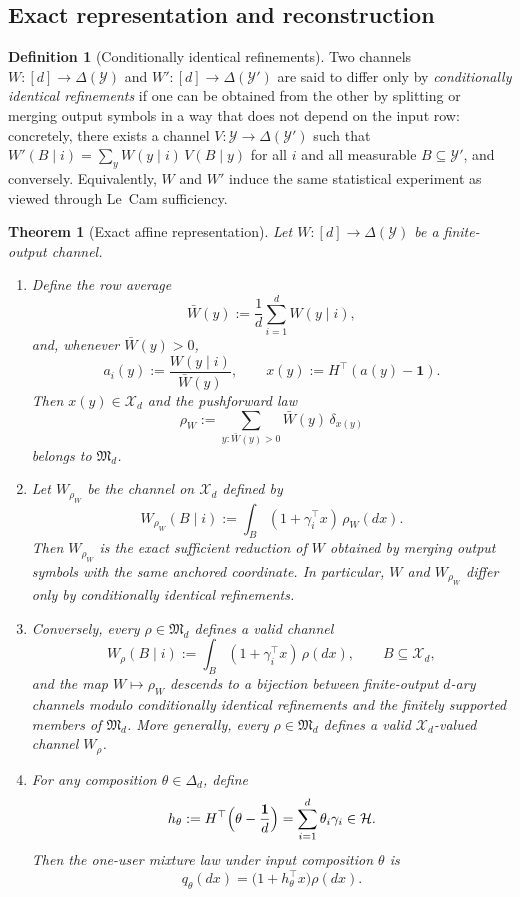 \documentclass[11pt]{amsart}
\newtheorem{theorem}{Theorem}[section]
\theoremstyle{definition}
\newtheorem{definition}[definition]{Definition}
\newcommand{\one}{\mathbf 1}
\newcommand{\cX}{\mathcal X}
\newcommand{\cY}{\mathcal Y}
\newcommand{\cH}{\mathcal H}
\newcommand{\fM}{\mathfrak M}
\begin{document}
\subsection{Exact representation and reconstruction}

\begin{definition}[Conditionally identical refinements]\label{def:cond-id-ref}
Two channels $W:[d]\to\Delta(\cY)$ and $W':[d]\to\Delta(\cY')$ are said to differ only by \emph{conditionally identical refinements} if one can be obtained from the other by splitting or merging output symbols in a way that does not depend on the input row: concretely, there exists a channel $V:\cY\to\Delta(\cY')$ such that $W'(B\mid i)=\sum_y W(y\mid i)\,V(B\mid y)$ for all $i$ and all measurable $B\subseteq\cY'$, and conversely. Equivalently, $W$ and $W'$ induce the same statistical experiment as viewed through Le~Cam sufficiency.
\end{definition}

\begin{theorem}[Exact affine representation]\label{thm:representation}
Let $W:[d]\to\Delta(\mathcal Y)$ be a finite-output channel.

\begin{enumerate}[label=\textup{(\roman*)}]
\item Define the row average
\[
\bar W(y):=\frac1d\sum_{i=1}^d W(y\mid i),
\]
and, whenever $\bar W(y)>0$,
\[
a_i(y):=\frac{W(y\mid i)}{\bar W(y)},\qquad x(y):=H^\top(a(y)-\one).
\]
Then $x(y)\in\cX_d$ and the pushforward law
\[
\rho_W:=\sum_{y:\bar W(y)>0}\bar W(y)\,\delta_{x(y)}
\]
belongs to $\fM_d$.

\item Let $W_{\rho_W}$ be the channel on $\cX_d$ defined by
\[
W_{\rho_W}(B\mid i):=\int_B (1+\gamma_i^\top x)\,\rho_W(dx).
\]
Then $W_{\rho_W}$ is the exact sufficient reduction of $W$ obtained by merging output symbols with the same anchored coordinate. In particular, $W$ and $W_{\rho_W}$ differ only by conditionally identical refinements.

\item Conversely, every $\rho\in\fM_d$ defines a valid channel
\[
W_\rho(B\mid i):=\int_B (1+\gamma_i^\top x)\,\rho(dx),\qquad B\subseteq\cX_d,
\]
and the map $W\mapsto\rho_W$ descends to a bijection between finite-output $d$-ary channels modulo conditionally identical refinements and the finitely supported members of $\fM_d$. More generally, every $\rho\in\fM_d$ defines a valid $\cX_d$-valued channel $W_\rho$.

\item For any composition $\theta\in\Delta_d$, define
\[
h_\theta:=H^\top\Bigl(\theta-\frac{\one}{d}\Bigr)=\sum_{i=1}^d \theta_i\gamma_i\in\cH.
\]
Then the one-user mixture law under input composition $\theta$ is
\[
q_\theta(dx)=\bigl(1+h_\theta^\top x\bigr)\rho(dx).
\]
\end{enumerate}
\end{theorem}
\end{document}
